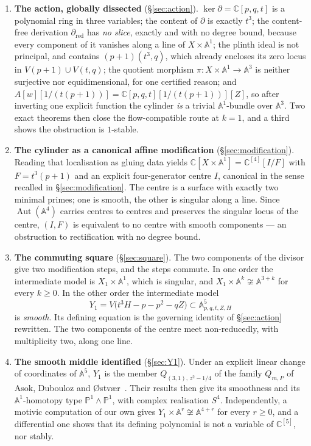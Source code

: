 \documentclass[11pt]{article}
\theoremstyle{definition}
\theoremstyle{remark}
\newcommand{\C}{\mathbb{C}}
\newcommand{\Aff}[1]{\mathbb{A}^{#1}}
\newcommand{\PP}{\mathbb{P}}
\newcommand{\Aut}{\operatorname{Aut}}
\begin{document}
\begin{enumerate}
\item \textbf{The action, globally dissected} (\S\ref{sec:action}).
$\ker\partial=\C[p,q,t]$ is a polynomial ring in three variables; the content
of $\partial$ is exactly $t^3$; the content-free derivation
$\partial_{\mathrm{red}}$ has \emph{no slice}, exactly and with no degree
bound, because every component of it vanishes along a line of
$X\times\Aff{1}$; the plinth ideal is not principal, and contains
$(p+1)(t^3,q)$, which already encloses its zero locus in $V(p+1)\cup V(t,q)$;
the quotient morphism $\pi\colon X\times\Aff{1}\to\Aff{3}$ is
neither surjective nor equidimensional, for one certified reason; and
$A[w][1/(t(p+1))]=\C[p,q,t][1/(t(p+1))][Z]$, so after inverting one explicit
function the cylinder \emph{is} a trivial $\Aff{1}$-bundle over $\Aff{3}$.
Two exact theorems then close the flow-compatible route at $k=1$, and a third
shows the obstruction is $1$-stable.

\item \textbf{The cylinder as a canonical affine modification}
(\S\ref{sec:modification}). Reading that localisation as gluing data yields
$\C[X\times\Aff{1}]=\C^{[4]}[I/F]$ with $F=t^3(p+1)$ and an explicit
four-generator centre $I$, canonical in the sense recalled in
\S\ref{sec:modification}. The centre is a surface with exactly two minimal
primes; one is smooth, the other is singular along a line. Since
$\Aut(\Aff{4})$ carries centres to centres and preserves the singular locus
of the centre, $(I,F)$ is equivalent to no centre with smooth components ---
an obstruction to rectification with no degree bound.

\item \textbf{The commuting square} (\S\ref{sec:square}). The two components
of the divisor give two modification steps, and the steps commute. In one
order the intermediate model is $X_1\times\Aff{1}$, which is singular, and
$X_1\times\Aff{k}\not\cong\Aff{3+k}$ for every $k\ge0$. In the other order the
intermediate model
\[
Y_1=V\bigl(t^3H-p-p^2-qZ\bigr)\subset\Aff{5}_{p,q,t,Z,H}
\]
is \emph{smooth}. Its defining equation is the governing identity of
\S\ref{sec:action} rewritten. The two components of the centre meet
non-reducedly, with multiplicity two, along one line.

\item \textbf{The smooth middle identified} (\S\ref{sec:Y1}). Under an
explicit linear change of coordinates of $\Aff{5}$, $Y_1$ is the member
$Q_{(3,1),\,z^2-1/4}$ of the family $Q_{m,P}$ of Asok, Dubouloz and
{\O}stv{\ae}r~\cite{ADO2021}. Their results then give its smoothness and its
$\Aff{1}$-homotopy type $\PP^1\wedge\PP^1$, with complex realisation $S^4$.
Independently, a motivic computation of our own gives
$Y_1\times\Aff{r}\not\cong\Aff{4+r}$ for every $r\ge0$, and a differential one
shows that its defining polynomial is not a variable of $\C^{[5]}$, nor
stably.


\end{enumerate}
\end{document}
